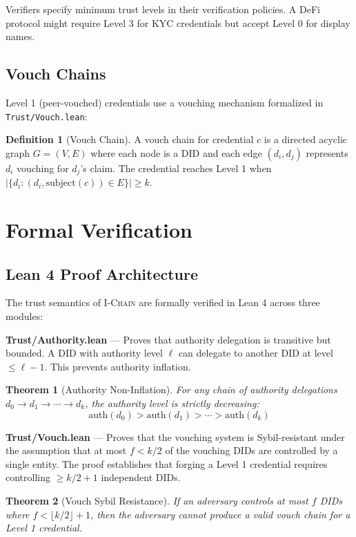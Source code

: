 \documentclass[11pt,letterpaper]{article}
\newtheorem{theorem}{Theorem}
\theoremstyle{definition}
\newtheorem{definition}{Definition}
\theoremstyle{remark}
\newcommand{\IChain}{\textsc{I-Chain}}
\begin{document}
Verifiers specify minimum trust levels in their verification policies. A DeFi protocol might require Level 3 for KYC credentials but accept Level 0 for display names.

\subsection{Vouch Chains}

Level 1 (peer-vouched) credentials use a vouching mechanism formalized in \texttt{Trust/Vouch.lean}:

\begin{definition}[Vouch Chain]
A vouch chain for credential $c$ is a directed acyclic graph $G = (V, E)$ where each node is a DID and each edge $(d_i, d_j)$ represents $d_i$ vouching for $d_j$'s claim. The credential reaches Level 1 when $|\{d_i : (d_i, \text{subject}(c)) \in E\}| \geq k$.
\end{definition}

\section{Formal Verification}

\subsection{Lean 4 Proof Architecture}

The trust semantics of \IChain{} are formally verified in Lean 4 across three modules:

\textbf{Trust/Authority.lean} --- Proves that authority delegation is transitive but bounded. A DID with authority level $\ell$ can delegate to another DID at level $\leq \ell - 1$. This prevents authority inflation.

\begin{theorem}[Authority Non-Inflation]
For any chain of authority delegations $d_0 \to d_1 \to \cdots \to d_k$, the authority level is strictly decreasing:
\[
\text{auth}(d_0) > \text{auth}(d_1) > \cdots > \text{auth}(d_k)
\]
\end{theorem}

\textbf{Trust/Vouch.lean} --- Proves that the vouching system is Sybil-resistant under the assumption that at most $f < k/2$ of the vouching DIDs are controlled by a single entity. The proof establishes that forging a Level 1 credential requires controlling $\geq k/2 + 1$ independent DIDs.

\begin{theorem}[Vouch Sybil Resistance]
If an adversary controls at most $f$ DIDs where $f < \lfloor k/2 \rfloor + 1$, then the adversary cannot produce a valid vouch chain for a Level 1 credential.
\end{theorem}
\end{document}
